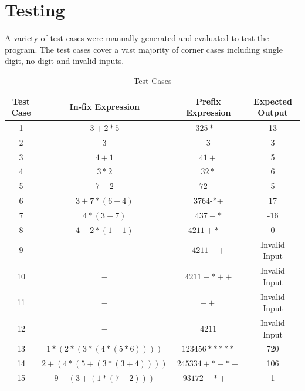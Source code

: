 \documentclass{article} %
\begin{document}
\section{Testing}
A variety of test cases were manually generated and evaluated to test the program. The test cases cover a vast majority of corner cases including single digit, no digit and invalid inputs.
\begin{table}[h]
    \centering
        \begin{tabular}{ |c|c|c|c| }
        \hline \hline
        Test Case & In-fix Expression & Prefix Expression & Expected Output \\
        \hline \hline
        1 & $3+2*5$ & $325*+$ & 13 \\
        \hline
        2 & $3$ & $3$ & 3 \\
        \hline
        3 & $4+1$ & $41+$ & 5 \\
        \hline
        4 & $3*2$ & $32*$ & 6 \\
        \hline
        5 & $7-2$ & $72-$ & 5 \\
        \hline
        6 & $3+7*(6-4)$ & 3764-*+ & 17 \\
        \hline
        7 & $4*(3-7)$ & $437-*$ & -16 \\
        \hline
        8 & $4-2*(1+1)$ & $4211+*-$ & 0 \\
        \hline
        9 & $-$ & $4211-+$ & Invalid Input \\
        \hline
        10 & $-$ & $4211-*++$ & Invalid Input \\
        \hline
        11 & $-$ & $-+$ & Invalid Input \\
        \hline
        12 & $-$ & $4211$ & Invalid Input \\
        \hline
        13 & $1*(2*(3*(4*(5*6))))$ & $123456*****$ & 720\\
        \hline
        14 & $2+(4*(5+(3*(3+4))))$ & $245334+*+*+$ & 106\\
        \hline
        15 & $9-(3+(1*(7-2)))$ & $93172-*+-$ & 1\\
        \hline
    \end{tabular}
    \caption{Test Cases}
    \label{tab:test_cases}
\end{table}
\end{document}
